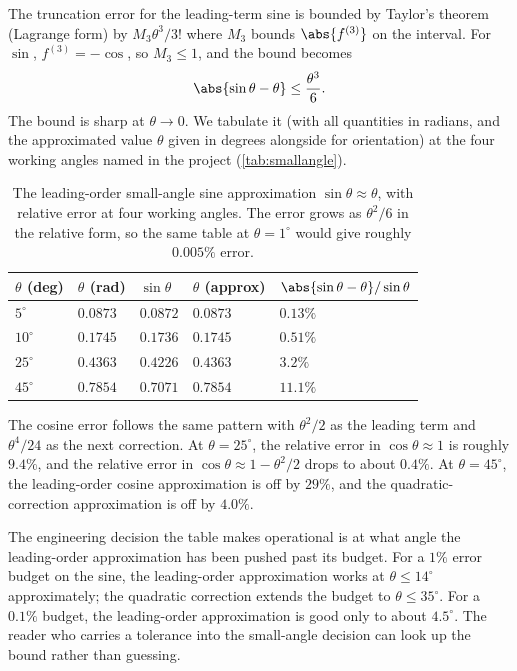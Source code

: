 The truncation error for the leading-term sine is bounded by Taylor's
theorem (Lagrange form) by $M_{3} \theta^{3}/3!$ where $M_{3}$ bounds
$\abs{f^{(3)}}$ on the interval. For $\sin$, $f^{(3)} = -\cos$, so
$M_{3} \leq 1$, and the bound becomes
\[
\abs{\sin \theta - \theta} \leq \frac{\theta^{3}}{6}.
\]
The bound is sharp at $\theta \to 0$. We tabulate it (with all
quantities in radians, and the approximated value $\theta$ given in
degrees alongside for orientation) at the four working angles named in
the project (\autoref{tab:smallangle}).

\begin{table}[h]
\centering
\begin{tabular}{lllll}
\toprule
$\theta$ (deg) & $\theta$ (rad) & $\sin \theta$ & $\theta$ (approx) &
$\abs{\sin \theta - \theta}/\sin \theta$ \\
\midrule
$5^{\circ}$ & $0.0873$ & $0.0872$ & $0.0873$ & $0.13\%$ \\
$10^{\circ}$ & $0.1745$ & $0.1736$ & $0.1745$ & $0.51\%$ \\
$25^{\circ}$ & $0.4363$ & $0.4226$ & $0.4363$ & $3.2\%$ \\
$45^{\circ}$ & $0.7854$ & $0.7071$ & $0.7854$ & $11.1\%$ \\
\bottomrule
\end{tabular}
\caption{The leading-order small-angle sine approximation $\sin \theta
\approx \theta$, with relative error at four working angles. The error
grows as $\theta^{2}/6$ in the relative form, so the same table at
$\theta = 1^{\circ}$ would give roughly $0.005\%$ error.}
\label{tab:smallangle}
\end{table}

The cosine error follows the same pattern with $\theta^{2}/2$ as the
leading term and $\theta^{4}/24$ as the next correction. At
$\theta = 25^{\circ}$, the relative error in $\cos \theta \approx 1$ is
roughly $9.4\%$, and the relative error in $\cos \theta \approx 1 -
\theta^{2}/2$ drops to about $0.4\%$. At $\theta = 45^{\circ}$, the
leading-order cosine approximation is off by $29\%$, and the
quadratic-correction approximation is off by $4.0\%$.

The engineering decision the table makes operational is at what angle
the leading-order approximation has been pushed past its budget. For a
$1\%$ error budget on the sine, the leading-order approximation works
at $\theta \leq 14^{\circ}$ approximately; the quadratic correction
extends the budget to $\theta \leq 35^{\circ}$. For a $0.1\%$ budget,
the leading-order approximation is good only to about $4.5^{\circ}$.
The reader who carries a tolerance into the small-angle decision can
look up the bound rather than guessing.

